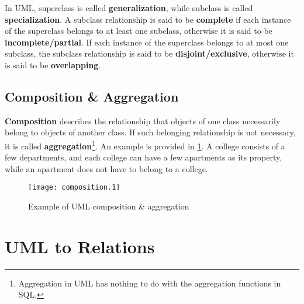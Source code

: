 In UML, superclass is called \textbf{generalization}, while subclass is called \textbf{specialization}. A subclass relationship is said to be \textbf{complete} if each instance of the superclass belongs to at least one subclass, otherwise it is said to be \textbf{incomplete/partial}. If each instance of the superclass belongs to at most one subclass, the subclass relationship is said to be \textbf{disjoint/exclusive}, otherwise it is said to be \textbf{overlapping}.
\subsection{Composition \& Aggregation}
\textbf{Composition} describes the relationship that objects of one class necessarily belong to objects of another class. If such belonging relationship is not necessary, it is called \textbf{aggregation}\footnote{Aggregation in UML has nothing to do with the aggregation functions in SQL.}. An example is provided in \ref{composition}. A college consists of a few departments, and each college can have a few apartments as its property, while an apartment does not have to belong to a college.
\begin{figure}[ht]
\centering
\texttt{[image: composition.1]}
\caption{Example of UML composition \& aggregation}\label{composition}
\end{figure}
\section{UML to Relations}
\ifx\PREAMBLE\undefined

\fi